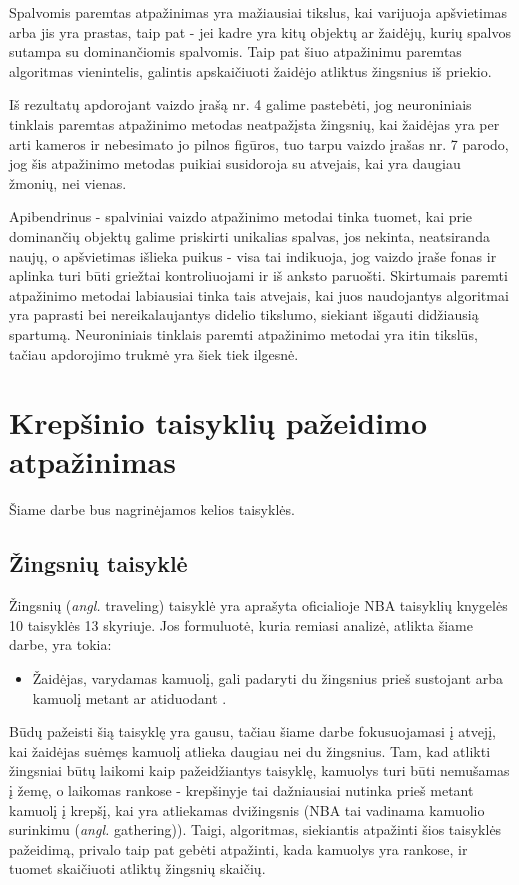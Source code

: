 \documentclass{VUMIFPSbakalaurinis}
\begin{document}
Spalvomis paremtas atpažinimas yra mažiausiai tikslus, kai varijuoja apšvietimas arba jis yra prastas, taip pat - jei kadre yra kitų objektų ar žaidėjų, kurių spalvos sutampa su dominančiomis spalvomis. Taip pat šiuo atpažinimu paremtas algoritmas vienintelis, galintis apskaičiuoti žaidėjo atliktus žingsnius iš priekio. 

Iš rezultatų apdorojant vaizdo įrašą nr. 4 galime pastebėti, jog neuroniniais tinklais paremtas atpažinimo metodas neatpažįsta žingsnių, kai žaidėjas yra per arti kameros ir nebesimato jo pilnos figūros, tuo tarpu vaizdo įrašas nr. 7 parodo, jog šis atpažinimo metodas puikiai susidoroja su atvejais, kai yra daugiau žmonių, nei vienas. 

Apibendrinus - spalviniai vaizdo atpažinimo metodai tinka tuomet, kai prie dominančių objektų galime priskirti unikalias spalvas, jos nekinta, neatsiranda naujų, o apšvietimas išlieka puikus - visa tai indikuoja, jog vaizdo įraše fonas ir aplinka turi būti griežtai kontroliuojami ir iš anksto paruošti. Skirtumais paremti atpažinimo metodai labiausiai tinka tais atvejais, kai juos naudojantys algoritmai yra paprasti bei nereikalaujantys didelio tikslumo, siekiant išgauti didžiausią spartumą. Neuroniniais tinklais paremti atpažinimo metodai yra itin tikslūs, tačiau apdorojimo trukmė yra šiek tiek ilgesnė.

\section{Krepšinio taisyklių pažeidimo atpažinimas}

Šiame darbe bus nagrinėjamos kelios taisyklės.

\subsection{Žingsnių taisyklė}
Žingsnių (\textit{angl.} traveling) taisyklė yra aprašyta oficialioje NBA taisyklių knygelės 10 taisyklės 13 skyriuje. Jos formuluotė, kuria remiasi analizė, atlikta šiame darbe, yra tokia: 
\begin{itemize}
	\item Žaidėjas, varydamas kamuolį, gali padaryti du žingsnius prieš sustojant arba kamuolį metant ar atiduodant \cite{nba-rules}. 
\end{itemize}
Būdų pažeisti šią taisyklę yra gausu, tačiau šiame darbe fokusuojamasi į atvejį, kai žaidėjas suėmęs kamuolį atlieka daugiau nei du žingsnius. Tam, kad atlikti žingsniai būtų laikomi kaip pažeidžiantys taisyklę, kamuolys turi būti nemušamas į žemę, o laikomas rankose - krepšinyje tai dažniausiai nutinka prieš metant kamuolį į krepšį, kai yra atliekamas dvižingsnis (NBA tai vadinama kamuolio surinkimu (\textit{angl.} gathering)). Taigi, algoritmas, siekiantis atpažinti šios taisyklės pažeidimą, privalo taip pat gebėti atpažinti, kada kamuolys yra rankose, ir tuomet skaičiuoti atliktų žingsnių skaičių. 
\end{document}
